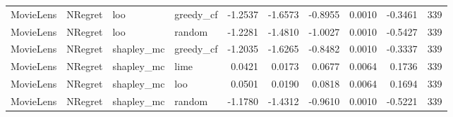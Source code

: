 \begin{longtable}{@{}p{}p{}p{}p{}rrrrrr@{}}
MovieLens & NRegret & loo & greedy\_cf & -1.2537 & -1.6573 & -0.8955 & 0.0010 & -0.3461 & 339 \\
MovieLens & NRegret & loo & random & -1.2281 & -1.4810 & -1.0027 & 0.0010 & -0.5427 & 339 \\
MovieLens & NRegret & shapley\_mc & greedy\_cf & -1.2035 & -1.6265 & -0.8482 & 0.0010 & -0.3337 & 339 \\
MovieLens & NRegret & shapley\_mc & lime & 0.0421 & 0.0173 & 0.0677 & 0.0064 & 0.1736 & 339 \\
MovieLens & NRegret & shapley\_mc & loo & 0.0501 & 0.0190 & 0.0818 & 0.0064 & 0.1694 & 339 \\
MovieLens & NRegret & shapley\_mc & random & -1.1780 & -1.4312 & -0.9610 & 0.0010 & -0.5221 & 339 \\
\end{longtable}
